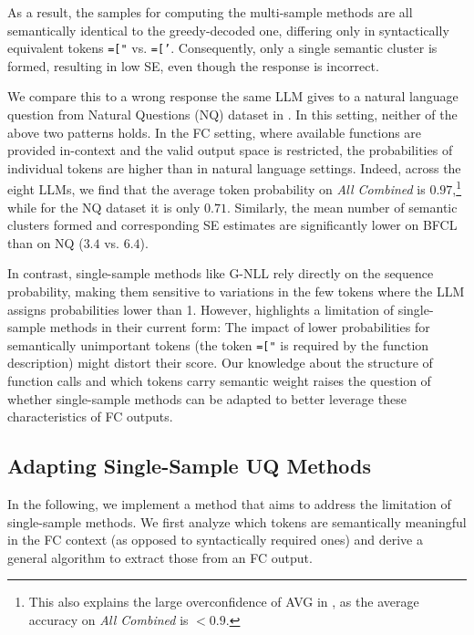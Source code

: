 As a result, the samples for computing the multi-sample methods are all semantically identical to the greedy-decoded one, differing only in syntactically equivalent tokens \texttt{=["} vs. \texttt{=['}.
Consequently, only a single semantic cluster is formed, resulting in low SE, even though the response is incorrect.

We compare this to a wrong response the same LLM gives to a natural language question from Natural Questions (NQ) dataset \cite{kwiatkowski2019natural} in . 
In this setting, neither of the above two patterns holds.
In the FC setting, where available functions are provided in-context and the valid output space is restricted, the probabilities of individual tokens are higher than in natural language settings. 
Indeed, across the eight LLMs, we find that the average token probability on \emph{All Combined} is $0.97$,\footnote{This also explains the large overconfidence of AVG in , as the average accuracy on \textit{All Combined} is $<0.9$.} while for the NQ dataset it is only $0.71$. 
Similarly, the mean number of semantic clusters formed and corresponding SE estimates are significantly lower on BFCL than on NQ ($3.4$ vs. $6.4$).%

In contrast, single-sample methods like G-NLL rely directly on the sequence probability, making them sensitive to variations in the few tokens where the LLM assigns probabilities lower than 1.
However,  highlights a limitation of single-sample methods in their current form: The impact of lower probabilities for semantically unimportant tokens (the token \texttt{=["} is required by the function description) might distort their score.
Our knowledge about the structure of function calls and which tokens carry semantic weight raises the question of whether single-sample methods can be adapted to better leverage these characteristics of FC outputs.



\subsection{Adapting Single-Sample UQ Methods}
\label{sec:new_method} 


In the following, we implement a method that aims to address the limitation of single-sample methods. 
We first analyze which tokens are semantically meaningful in the FC context (as opposed to syntactically required ones) and derive a general algorithm to extract those from an FC output. 

